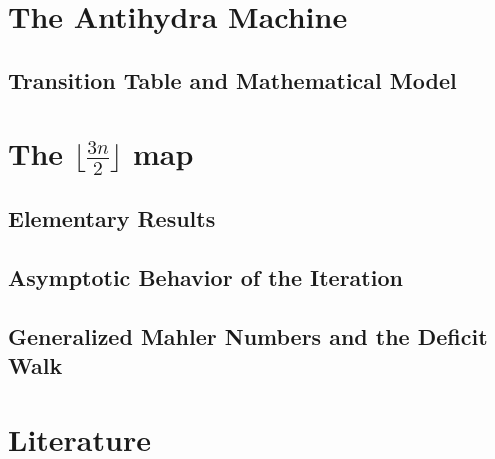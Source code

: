 \begin{abstract}
This is a collection of autoformalizations of definitions and elementary lemmas associated
with the Collatz Conjecture. The focus is first on facts needed to build up recent arguments
by Rozier and Terracol\cite{rozier2025paradoxical}. Secondly, we attempt to be more complete
regarding elementary lemmas to
allow shorter proofs of more advanced theorems. The work is motivated by an urge to understand
current research better, but also by the idea of a specialized library of autoformalizations,
should the need arise for it.
\end{abstract}

\chapter{The Antihydra Machine}
\section{Transition Table and Mathematical Model}


\chapter{The $\lfloor\frac{3n}2\rfloor$ map}
\section{Elementary Results}


\section{Asymptotic Behavior of the Iteration}


\section{Generalized Mahler Numbers and the Deficit Walk}







\chapter{Literature}

